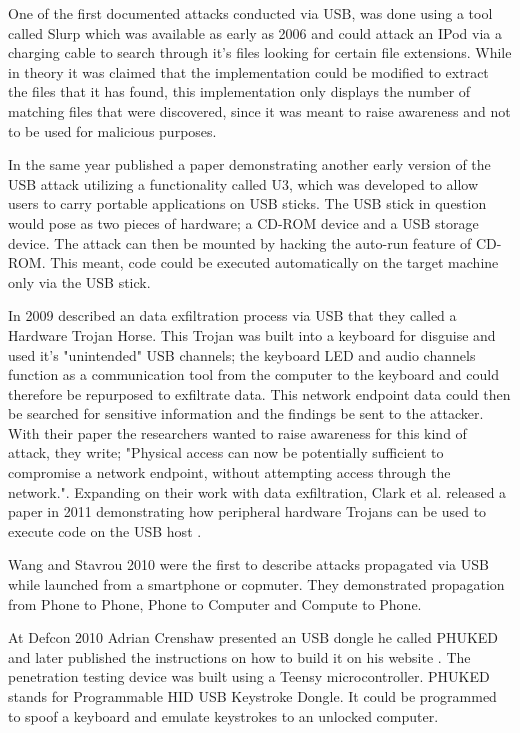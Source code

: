 One of the first documented attacks conducted via USB, was done using a tool called Slurp \cite{SharpIdeasDownloads2006} which was available as early as 2006 and could attack an IPod via a charging cable to search through it's files looking for certain file extensions. While in theory it was claimed that the implementation could be modified to extract the files that it has found, this implementation only displays the number of matching files that were discovered, since it was meant to raise awareness and not to be used for malicious purposes. 

In the same year \cite{al-zarouniRealityRisksConsented2006} published a paper demonstrating another early version of the USB attack utilizing a functionality called U3, which was developed to allow users to carry portable applications on USB sticks. The USB stick in question would pose as two pieces of hardware; a CD-ROM device and a USB storage device. The attack can then be mounted by hacking the auto-run feature of CD-ROM. This meant, code could be executed automatically on the target machine only via the USB stick. 

In 2009 \cite{clarkHardwareTrojanHorse2009} described an data exfiltration process via USB that they called a Hardware Trojan Horse. This Trojan was built into a keyboard for disguise and used it's "unintended" USB channels; the keyboard LED and audio channels function as a communication tool from the computer to the keyboard and could therefore be repurposed to exfiltrate data. This network endpoint data could then be searched for sensitive information and the findings be sent to the attacker. With their paper the researchers wanted to raise awareness for this kind of attack, they write; "Physical access can now be potentially sufficient to compromise a network endpoint, without attempting access through the network.".
Expanding on their work with data exfiltration, Clark et al. released a paper in 2011 demonstrating how peripheral hardware Trojans can be used to execute code on the USB host \cite{clarkRisksAssociatedUSB2011}. 

Wang and Stavrou 2010 \cite{wangExploitingSmartphoneUSB2010} were the first to describe attacks propagated via USB while launched from a smartphone or copmuter. They demonstrated propagation from Phone to Phone, Phone to Computer and Compute to Phone.

At Defcon 2010 Adrian Crenshaw presented an USB dongle he called PHUKED and later published the instructions on how to build it on his website \cite{ProgrammableHIDUSB}. The penetration testing device was built using a Teensy microcontroller. PHUKED stands for Programmable HID USB Keystroke Dongle. It could be programmed to spoof a keyboard and emulate keystrokes to an unlocked computer. 

